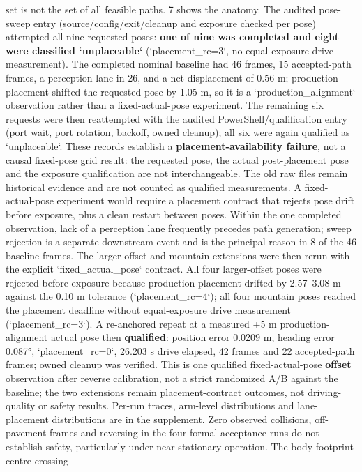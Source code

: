 \documentclass[journal]{IEEEtran}
\begin{document}
set is not the set of all feasible paths. 7 shows the anatomy.
The audited pose-sweep entry (source/config/exit/cleanup and exposure checked per pose) attempted
all nine requested poses: \textbf{one of nine was completed and eight were classified `unplaceable`}
(`placement_rc=3`, no equal-exposure drive measurement). The completed nominal baseline had 46 frames,
15 accepted-path frames, a perception lane in 26, and a net displacement of 0.56 m; production placement
shifted the requested pose by 1.05 m, so it is a `production_alignment` observation rather than a
fixed-actual-pose experiment. The remaining six requests were then reattempted with the audited
PowerShell/qualification entry (port wait, port rotation, backoff, owned cleanup); all six were again
qualified as `unplaceable`. These records establish a \textbf{placement-availability failure}, not a causal
fixed-pose grid result: the requested pose, the actual post-placement pose and the exposure qualification
are not interchangeable. The old raw files remain historical evidence and are not counted as qualified
measurements. A fixed-actual-pose experiment would require a placement contract that rejects pose drift
before exposure, plus a clean restart between poses. Within the one completed observation, lack of a
perception lane frequently precedes path generation; sweep rejection is a separate downstream event and
is the principal reason in 8 of the 46 baseline frames. The larger-offset and mountain extensions were then rerun with the explicit `fixed_actual_pose` contract.
All four larger-offset poses were rejected before exposure because production placement drifted by 2.57--3.08 m
against the 0.10 m tolerance (`placement_rc=4`); all four mountain poses reached the placement deadline
without equal-exposure drive measurement (`placement_rc=3`). A re-anchored repeat at a measured +5 m production-alignment actual pose then \textbf{qualified}: position error 0.0209 m,
heading error 0.087°, `placement_rc=0`, 26.203 s drive elapsed, 42 frames and 22 accepted-path frames; owned cleanup
was verified. This is one qualified fixed-actual-pose \textbf{offset} observation after reverse calibration, not a strict
randomized A/B against the baseline; the two extensions remain placement-contract outcomes, not driving-quality
or safety results.
Per-run traces, arm-level distributions and lane-placement distributions are in the supplement.
Zero observed collisions, off-pavement frames and reversing in the four formal acceptance runs do not
establish safety, particularly under near-stationary operation. The body-footprint centre-crossing
\end{document}
